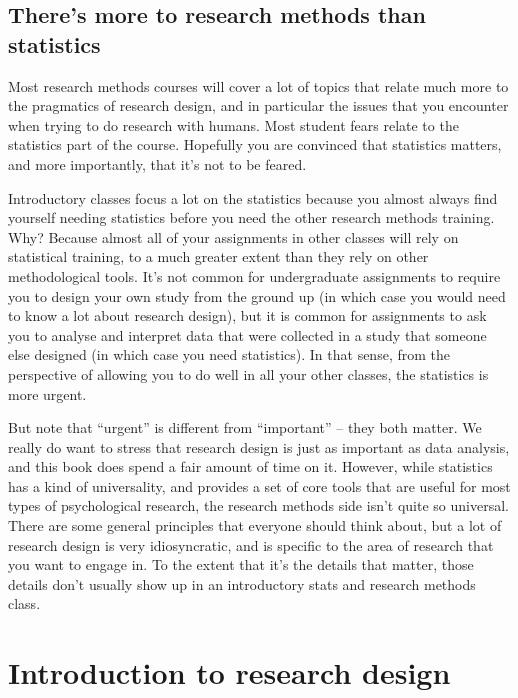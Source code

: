 \documentclass[
  11pt,
]{book}
\theoremstyle{indenteddefinition}
\theoremstyle{indenteddefinition}
\theoremstyle{definition}
\theoremstyle{definition}
\theoremstyle{remark}
\begin{document}
\hypertarget{theres-more-to-research-methods-than-statistics}{%
\section{There's more to research methods than statistics}\label{theres-more-to-research-methods-than-statistics}}

Most research methods courses will cover a lot of topics that relate much more to the pragmatics of research design, and in particular the issues that you encounter when trying to do research with humans. Most student fears relate to the statistics part of the course. Hopefully you are convinced that statistics matters, and more importantly, that it's not to be feared.

Introductory classes focus a lot on the statistics because you almost always find yourself needing statistics before you need the other research methods training. Why? Because almost all of your assignments in other classes will rely on statistical training, to a much greater extent than they rely on other methodological tools. It's not common for undergraduate assignments to require you to design your own study from the ground up (in which case you would need to know a lot about research design), but it is common for assignments to ask you to analyse and interpret data that were collected in a study that someone else designed (in which case you need statistics). In that sense, from the perspective of allowing you to do well in all your other classes, the statistics is more urgent.

But note that ``urgent'' is different from ``important'' -- they both matter. We really do want to stress that research design is just as important as data analysis, and this book does spend a fair amount of time on it. However, while statistics has a kind of universality, and provides a set of core tools that are useful for most types of psychological research, the research methods side isn't quite so universal. There are some general principles that everyone should think about, but a lot of research design is very idiosyncratic, and is specific to the area of research that you want to engage in. To the extent that it's the details that matter, those details don't usually show up in an introductory stats and research methods class.

\hypertarget{researchdesign}{%
\chapter{Introduction to research design}\label{researchdesign}}
\end{document}
